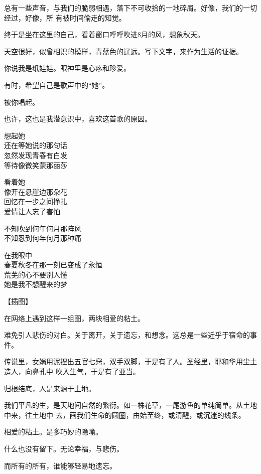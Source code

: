 \documentclass[12pt,a4paper]{article}
\begin{document}
		总有一些声音，与我们的脆弱相遇，落下不可收拾的一地碎屑。好像，我们的一切经过，好像，所
	有被时间偷走的知觉。


		终于是坐在这里的自己，看着窗口呼呼吹进8月的风，想象秋天。

		天空很好，似曾相识的模样，青蓝色的辽远。写下文字，来作为生活的证据。


		你说我是纸娃娃。眼神里是心疼和珍爱。

		有时，希望自己是歌声中的“她”。

		被你唱起。

		也许，这也是我潜意识中，喜欢这首歌的原因。

		\longpoem{}{}{}
		想起她 \\
		还在等她说的那句话 \\
		忽然发现青春有白发 \\
		等待像微笑蒙那丽莎

		看着她 \\
		像开在悬崖边那朵花 \\
		回忆在一步之间挣扎 \\
		爱情让人忘了害怕

		不知吹到何年何月那阵风 \\
		不知忍到何年何月那种痛

		在我眼中 \\
		春夏秋冬在那一刻已变成了永恒 \\
		荒芜的心不要别人懂 \\
		她是我不想醒来的梦
		\endlongpoem

	\endwriting




		【插图】

		在网络上遇到这样一组图，两块相爱的粘土。

		难免引人悲伤的对白。关于离开，关于遗忘，和想念。这总是一些近乎于宿命的事件。

		传说里，女娲用泥捏出五官七窍，双手双脚，于是有了人。圣经里，耶和华用尘土造人，向鼻孔中
	吹入生气，于是有了亚当。

		归根结底，人是来源于土地。

		我们平凡的生，是天地间自然的繁衍。如一株花草，一尾游鱼的单纯简单。从土地中来，往土地中
	去，画我们生命的圆圈，由始至终，或清醒，或沉迷的线条。

		相爱的粘土。是多巧妙的隐喻。


		什么也没有留下。无论幸福，与悲伤。

		而所有的所有，谁能够轻易地遗忘。
\end{document}
